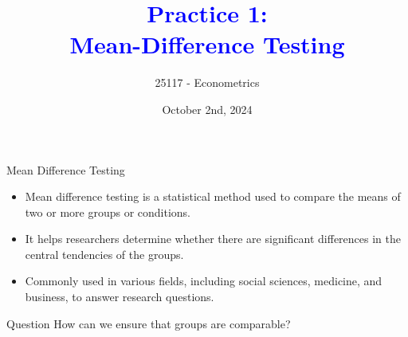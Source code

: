 \documentclass[notes,10pt, aspectratio=169]{beamer}
\title[]{\textcolor{blue}{Practice 1:\\Mean-Difference Testing}}
\author{25117 - Econometrics}
\institute[shortinst]{Universitat Pompeu Fabra}
\date{October 2nd, 2024}
\begin{document}

\begin{frame}[plain]
\maketitle
\end{frame}


\begin{frame}{Mean Difference Testing}
\begin{itemize}
    \item Mean difference testing is a statistical method used to compare the means of two or more groups or conditions.
    \item It helps researchers determine whether there are significant differences in the central tendencies of the groups.
    \item Commonly used in various fields, including social sciences, medicine, and business, to answer research questions.
\end{itemize}

    \begin{exampleblock}{Question}
 How can we ensure that groups are comparable?
    \end{exampleblock}


\end{frame}
\end{document}
